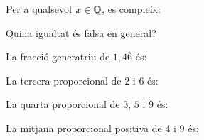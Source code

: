 \begin{enumerate}
\pregunta Per a qualsevol \(x\in\mathbb{Q}\), es compleix:
\begin{enumerate}
\end{enumerate}
\feedback

\pregunta Quina igualtat és falsa en general?
\begin{enumerate}
\end{enumerate}
\feedback

\pregunta La fracció generatriu de \(1{,}4\overline{6}\) és:
\begin{enumerate}
\end{enumerate}
\feedback

\pregunta La tercera proporcional de \(2\) i \(6\) és:
\begin{enumerate}
\end{enumerate}
\feedback

\pregunta La quarta proporcional de \(3\), \(5\) i \(9\) és:
\begin{enumerate}
\end{enumerate}
\feedback

\pregunta La mitjana proporcional positiva de \(4\) i \(9\) és:
\begin{enumerate}
\end{enumerate}
\feedback
\end{enumerate}
